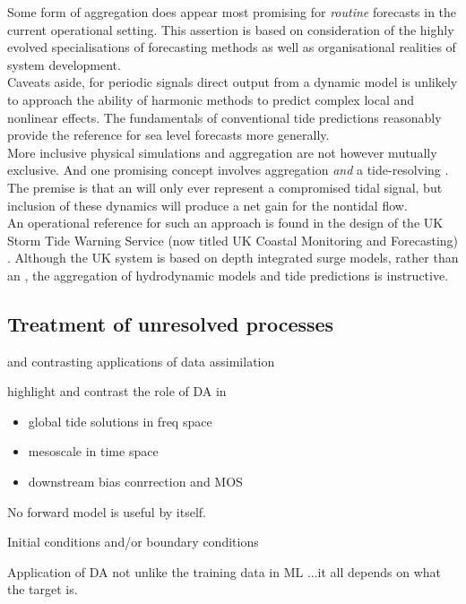 Some form of aggregation does appear most promising for \emph{routine} forecasts in the current operational setting.  
This assertion is based on consideration of the highly evolved specialisations of forecasting methods as well as organisational realities of system development.\\
Caveats aside, for periodic signals direct output from a dynamic model is unlikely to approach the ability of harmonic methods to predict complex local and nonlinear effects.   The fundamentals of conventional tide predictions reasonably provide the reference for sea level forecasts more generally. \\



More inclusive physical simulations and aggregation are not however mutually exclusive.  
And one promising concept involves aggregation \emph{and} a tide-resolving \OGCM{}.  The premise is that an \OGCM{} will only ever represent a compromised tidal signal, but inclusion of these dynamics will produce a net gain for the nontidal flow.\\
An operational reference for such an approach is found in the design of the UK Storm Tide Warning Service (now titled UK Coastal Monitoring and Forecasting) \cite{Horsburg:2009ui}.   Although the UK system is based on depth integrated surge models, rather than an \OGCM{}, the aggregation of hydrodynamic models and tide predictions is instructive.\\   

 


\subsection{Treatment of unresolved processes}

and contrasting applications of data assimilation

highlight and contrast the role of DA in 
\begin{itemize}
    \item global tide solutions in freq space
    \item mesoscale in time space
    \item downstream bias conrrection and MOS
\end{itemize}

No forward model is useful by itself.

Initial conditions and/or boundary conditions 

Application of DA not unlike the training data in ML ...it all depends on what the target is.

